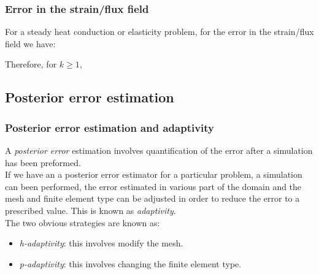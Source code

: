 \documentclass[notes]{beamer}
\begin{document}
\begin{frame}
\frametitle{Error in the strain/flux field}
For a steady heat conduction or elasticity problem, for the error in the strain/flux field we have:

Therefore, for $k \ge 1$,

\end{frame}

\subsection{Posterior error estimation}
\begin{frame}
\frametitle{Posterior error estimation and adaptivity}
A \textit{posterior error} estimation involves quantification of the error after a simulation has
been preformed.\\

If we have an a posterior error estimator for a particular problem, a simulation can
been performed, the error estimated in various part of the domain and the mesh and
finite element type can be adjusted in order to reduce the error to a prescribed value.
This is known as \textit{adaptivity}. \\

The two obvious strategies are known as:
	\begin{itemize}
		\item \textit{h-adaptivity}: this involves modify the mesh.
		\item \textit{p-adaptivity}: this involves changing the finite element type.
	\end{itemize}
\end{frame}
\end{document}
